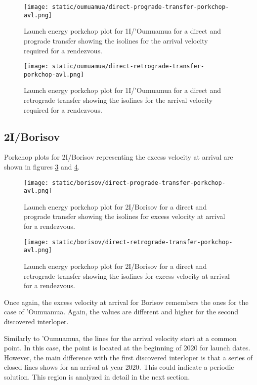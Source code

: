 \newpage
\begin{figure}[H]
  \centering
  \texttt{[image: static/oumuamua/direct-prograde-transfer-porkchop-avl.png]}
  \caption[Direct and prograde launch energy porkchop for 'Oumuamua]{Launch energy porkchop plot for 1I/'Oumuamua for a direct and prograde transfer showing the isolines for the arrival velocity required for a rendezvous.}
  \label{fig:oumuamua-direct-prograde-transfer-porkchop-avl}
\end{figure}

\begin{figure}[H]
  \centering
  \texttt{[image: static/oumuamua/direct-retrograde-transfer-porkchop-avl.png]}
  \caption[Direct and prograde launch energy porkchop for
    'Oumuamua]{Launch energy porkchop plot for 1I/'Oumuamua for a direct and
    retrograde transfer showing the isolines for the arrival velocity required for a rendezvous.}
  \label{fig:oumuamua-direct-retrograde-transfer-porkchop-avl}
\end{figure}

\subsection{2I/Borisov}

Porkchop plots for 2I/Borisov representing the excess velocity at arrival are
shown in figures \ref{fig:borisov-direct-prograde-transfer-porkchop-avl} and
\ref{fig:borisov-direct-retrograde-transfer-porkchop-avl}.

\begin{figure}[H]
  \centering
  \texttt{[image: static/borisov/direct-prograde-transfer-porkchop-avl.png]}
  \caption[Direct and prograde arrival excess velocity porkchop for
    Borisov]{Launch energy porkchop plot for 2I/Borisov for a direct and
    prograde transfer showing the isolines for excess velocity at arrival
    for a rendezvous.}
  \label{fig:borisov-direct-prograde-transfer-porkchop-avl}
\end{figure}

\begin{figure}[H]
  \centering
  \texttt{[image: static/borisov/direct-retrograde-transfer-porkchop-avl.png]}
  \caption[Direct and retrograde arrival excess velocity porkchop for
    Borisov]{Launch energy porkchop plot for 2I/Borisov for a direct and
    retrograde transfer showing the isolines for excess velocity at arrival
    for a rendezvous.}
  \label{fig:borisov-direct-retrograde-transfer-porkchop-avl}
\end{figure}

Once again, the excess velocity at arrival for Borisov remembers the ones for
the case of 'Oumuamua. Again, the values are different and higher for the second
discovered interloper.

Similarly to 'Oumuamua, the lines for the arrival velocity start at a common
point. In this case, the point is located at the beginning of 2020 for launch
dates. However, the main difference with the first discovered interloper is that
a series of closed lines shows for an arrival at year 2020. This could indicate
a periodic solution. This region is analyzed in detail in the next section.
